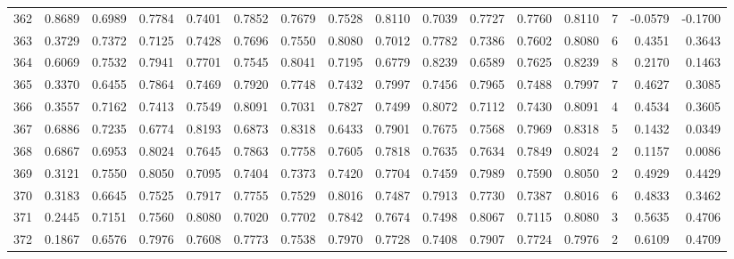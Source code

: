 \begin{tabular}{lrrrrrrrrrrrrrrr}
362 &      0.8689 &  0.6989 &  0.7784 &  0.7401 &  0.7852 &  0.7679 &  0.7528 &  0.8110 &  0.7039 &  0.7727 &   0.7760 &     0.8110 &      7 &                   -0.0579 &                    -0.1700 \\
363 &      0.3729 &  0.7372 &  0.7125 &  0.7428 &  0.7696 &  0.7550 &  0.8080 &  0.7012 &  0.7782 &  0.7386 &   0.7602 &     0.8080 &      6 &                    0.4351 &                     0.3643 \\
364 &      0.6069 &  0.7532 &  0.7941 &  0.7701 &  0.7545 &  0.8041 &  0.7195 &  0.6779 &  0.8239 &  0.6589 &   0.7625 &     0.8239 &      8 &                    0.2170 &                     0.1463 \\
365 &      0.3370 &  0.6455 &  0.7864 &  0.7469 &  0.7920 &  0.7748 &  0.7432 &  0.7997 &  0.7456 &  0.7965 &   0.7488 &     0.7997 &      7 &                    0.4627 &                     0.3085 \\
366 &      0.3557 &  0.7162 &  0.7413 &  0.7549 &  0.8091 &  0.7031 &  0.7827 &  0.7499 &  0.8072 &  0.7112 &   0.7430 &     0.8091 &      4 &                    0.4534 &                     0.3605 \\
367 &      0.6886 &  0.7235 &  0.6774 &  0.8193 &  0.6873 &  0.8318 &  0.6433 &  0.7901 &  0.7675 &  0.7568 &   0.7969 &     0.8318 &      5 &                    0.1432 &                     0.0349 \\
368 &      0.6867 &  0.6953 &  0.8024 &  0.7645 &  0.7863 &  0.7758 &  0.7605 &  0.7818 &  0.7635 &  0.7634 &   0.7849 &     0.8024 &      2 &                    0.1157 &                     0.0086 \\
369 &      0.3121 &  0.7550 &  0.8050 &  0.7095 &  0.7404 &  0.7373 &  0.7420 &  0.7704 &  0.7459 &  0.7989 &   0.7590 &     0.8050 &      2 &                    0.4929 &                     0.4429 \\
370 &      0.3183 &  0.6645 &  0.7525 &  0.7917 &  0.7755 &  0.7529 &  0.8016 &  0.7487 &  0.7913 &  0.7730 &   0.7387 &     0.8016 &      6 &                    0.4833 &                     0.3462 \\
371 &      0.2445 &  0.7151 &  0.7560 &  0.8080 &  0.7020 &  0.7702 &  0.7842 &  0.7674 &  0.7498 &  0.8067 &   0.7115 &     0.8080 &      3 &                    0.5635 &                     0.4706 \\
372 &      0.1867 &  0.6576 &  0.7976 &  0.7608 &  0.7773 &  0.7538 &  0.7970 &  0.7728 &  0.7408 &  0.7907 &   0.7724 &     0.7976 &      2 &                    0.6109 &                     0.4709 \\

\end{tabular}
